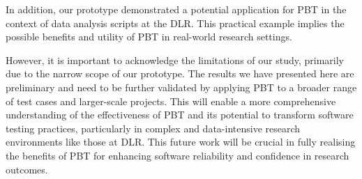 \documentclass[runningheads]{llncs}
\begin{document}
In addition, our prototype demonstrated a potential application for PBT in the context of data analysis scripts at the DLR. This practical example implies the possible benefits and utility of PBT in real-world research settings.

However, it is important to acknowledge the limitations of our study, primarily due to the narrow scope of our prototype. The results we have presented here are preliminary and need to be further validated by applying PBT to a broader range of test cases and larger-scale projects. This will enable a more comprehensive understanding of the effectiveness of PBT and its potential to transform software testing practices, particularly in complex and data-intensive research environments like those at DLR. This future work will be crucial in fully realising the benefits of PBT for enhancing software reliability and confidence in research outcomes.

%
%
%
\newpage


\end{document}
